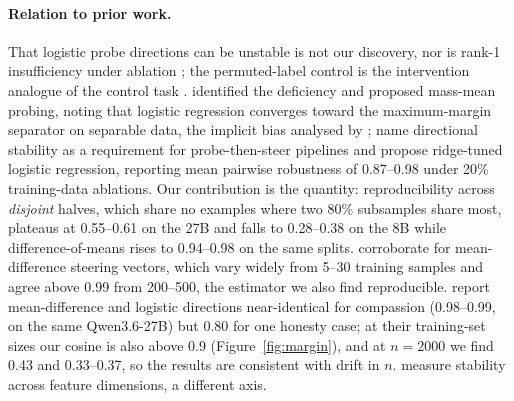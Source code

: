 \documentclass[11pt]{article}
\begin{document}
\paragraph{Relation to prior work.} That logistic probe directions can be unstable is not our discovery, nor is rank-1 insufficiency under ablation \citep{elazar2021amnesic,ravfogel2020inlp,belrose2023leace}; the permuted-label control is the intervention analogue of the control task \citep{hewitt2019control}. \citet{marks2023geometry} identified the deficiency and proposed mass-mean probing, noting that logistic regression converges toward the maximum-margin separator on separable data, the implicit bias analysed by \citet{soudry2018implicit}; \citet{gao2026raptor} name directional stability as a requirement for probe-then-steer pipelines and propose ridge-tuned logistic regression, reporting mean pairwise robustness of 0.87--0.98 under 20\% training-data ablations. Our contribution is the quantity: reproducibility across \emph{disjoint} halves, which share no examples where two 80\% subsamples share most, plateaus at 0.55--0.61 on the 27B and falls to 0.28--0.38 on the 8B while difference-of-means rises to 0.94--0.98 on the same splits. \citet{braun2025unreliability} corroborate for mean-difference steering vectors, which vary widely from 5--30 training samples and agree above 0.99 from 200--500, the estimator we also find reproducible. \citet{herbster2026steering} report mean-difference and logistic directions near-identical for compassion (0.98--0.99, on the same Qwen3.6-27B) but 0.80 for one honesty case; at their training-set sizes our cosine is also above 0.9 (Figure~\ref{fig:margin}), and at $n=2000$ we find 0.43 and 0.33--0.37, so the results are consistent with drift in $n$. \citet{raju2026geometric} measure stability across feature dimensions, a different axis.
\end{document}
